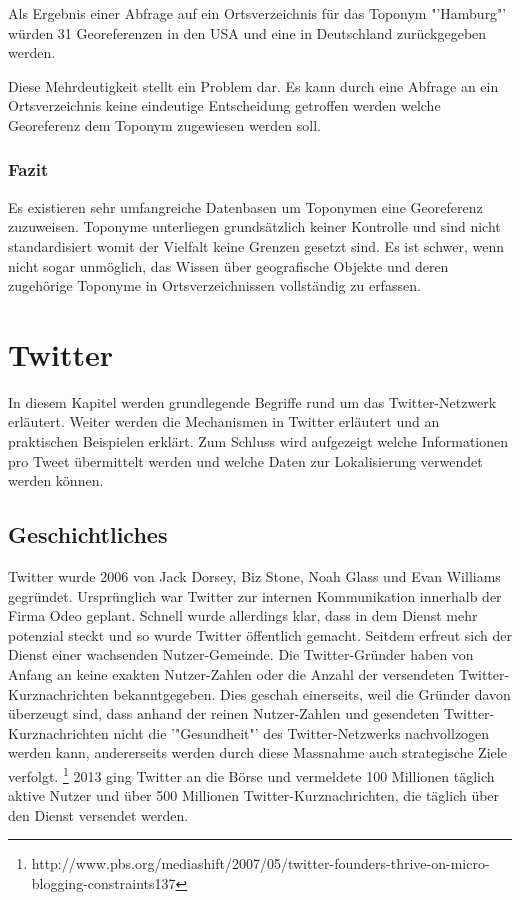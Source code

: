 			Als Ergebnis einer Abfrage auf ein Ortsverzeichnis für das Toponym "'Hamburg"' würden 31 Georeferenzen in den USA und eine in Deutschland zurückgegeben werden. 

			Diese Mehrdeutigkeit stellt ein Problem dar.
			Es kann durch eine Abfrage an ein Ortsverzeichnis keine eindeutige Entscheidung getroffen werden welche Georeferenz dem Toponym zugewiesen werden soll. 

		\subsubsection{Fazit}

			Es existieren sehr umfangreiche Datenbasen um Toponymen eine Georeferenz zuzuweisen. 
			Toponyme unterliegen grundsätzlich keiner Kontrolle und sind nicht standardisiert womit der Vielfalt keine Grenzen gesetzt sind.
			Es ist schwer, wenn nicht sogar unmöglich, das Wissen über geografische Objekte und deren zugehörige Toponyme in Ortsverzeichnissen vollständig zu erfassen.


	


	\section{Twitter} 
	
		In diesem Kapitel werden grundlegende Begriffe rund um das Twitter-Netzwerk erläutert. 
		Weiter werden die Mechanismen in Twitter erläutert und an praktischen Beispielen erklärt. 
		Zum Schluss wird aufgezeigt welche Informationen pro Tweet übermittelt werden und welche Daten zur Lokalisierung verwendet werden können.

			\subsection{Geschichtliches}
			Twitter wurde 2006 von Jack Dorsey, Biz Stone, Noah Glass und Evan Williams gegründet.
			Ursprünglich war Twitter zur internen Kommunikation innerhalb der Firma Odeo geplant.
			Schnell wurde allerdings klar, dass in dem Dienst mehr potenzial steckt und so wurde Twitter öffentlich gemacht.
			Seitdem erfreut sich der Dienst einer wachsenden Nutzer-Gemeinde.
			Die Twitter-Gründer haben von Anfang an keine exakten Nutzer-Zahlen oder die Anzahl der versendeten Twitter-Kurznachrichten bekanntgegeben.
			Dies geschah einerseits, weil die Gründer davon überzeugt sind, dass anhand der reinen Nutzer-Zahlen und gesendeten Twitter-Kurznachrichten nicht die '"Gesundheit"' des Twitter-Netzwerks nachvollzogen werden kann, andererseits werden durch diese Massnahme auch strategische Ziele verfolgt.  \footnote{http://www.pbs.org/mediashift/2007/05/twitter-founders-thrive-on-micro-blogging-constraints137}
			2013 ging Twitter an die Börse und vermeldete 100 Millionen täglich aktive Nutzer und über 500 Millionen Twitter-Kurznachrichten, die täglich über den Dienst versendet werden. 

